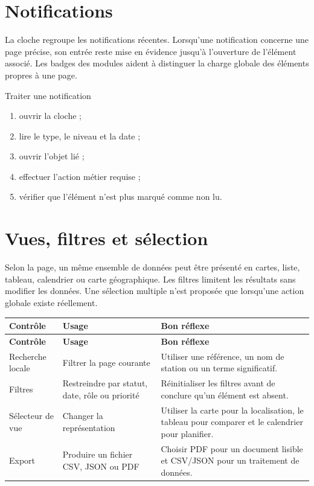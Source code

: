 \section{Notifications}

La cloche regroupe les notifications récentes. Lorsqu'une notification concerne
une page précise, son entrée reste mise en évidence jusqu'à l'ouverture de
l'élément associé. Les badges des modules aident à distinguer la charge globale
des éléments propres à une page.

\begin{procedurebox}{Traiter une notification}
  \begin{enumerate}[leftmargin=1.6em]
    \item ouvrir la cloche ;
    \item lire le type, le niveau et la date ;
    \item ouvrir l'objet lié ;
    \item effectuer l'action métier requise ;
    \item vérifier que l'élément n'est plus marqué comme non lu.
  \end{enumerate}
\end{procedurebox}

\section{Vues, filtres et sélection}

Selon la page, un même ensemble de données peut être présenté en cartes, liste,
tableau, calendrier ou carte géographique. Les filtres limitent les résultats
sans modifier les données. Une sélection multiple n'est proposée que lorsqu'une
action globale existe réellement.

\begin{longtable}{|L{3.1cm}|L{5.1cm}|L{7.2cm}|}
  \hline
  \textbf{Contrôle} & \textbf{Usage} & \textbf{Bon réflexe} \\ \hline
  \endfirsthead
  \hline
  \textbf{Contrôle} & \textbf{Usage} & \textbf{Bon réflexe} \\ \hline
  \endhead
  Recherche locale & Filtrer la page courante & Utiliser une référence, un nom
  de station ou un terme significatif. \\ \hline
  Filtres & Restreindre par statut, date, rôle ou priorité & Réinitialiser les
  filtres avant de conclure qu'un élément est absent. \\ \hline
  Sélecteur de vue & Changer la représentation & Utiliser la carte pour la
  localisation, le tableau pour comparer et le calendrier pour planifier. \\ \hline
  Export & Produire un fichier CSV, JSON ou PDF & Choisir PDF pour un document
  lisible et CSV/JSON pour un traitement de données. \\ \hline
\end{longtable}

